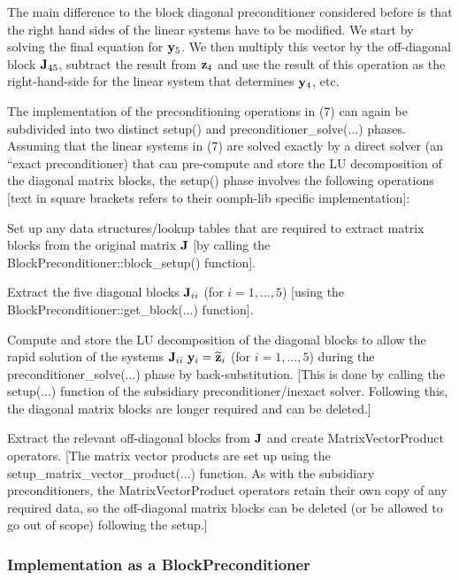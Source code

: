 The main difference to the block diagonal preconditioner considered before is that the right hand sides of the linear systems have to be modified. We start by solving the final equation for $ {\bf y}_5 $. We then multiply this vector by the off-\/diagonal block $ {\bf J}_{45} $, subtract the result from $ {\bf z}_4 $ and use the result of this operation as the right-\/hand-\/side for the linear system that determines $ {\bf y}_4$, etc.

The implementation of the preconditioning operations in (7) can again be subdivided into two distinct {\ttfamily setup()} and {\ttfamily preconditioner\+\_\+solve}(...) phases. Assuming that the linear systems in (7) are solved exactly by a direct solver (an ``exact preconditioner\textquotesingle{}\textquotesingle{}) that can pre-\/compute and store the LU decomposition of the diagonal matrix blocks, the {\ttfamily setup()} phase involves the following operations \mbox{[}text in square brackets refers to their {\ttfamily oomph-\/lib} specific implementation\mbox{]}\+:
\begin{DoxyItemize}
\item Set up any data structures/lookup tables that are required to extract matrix blocks from the original matrix ${\bf J}$ \mbox{[}by calling the {\ttfamily Block\+Preconditioner\+::block\+\_\+setup()} function\mbox{]}.
\item Extract the five diagonal blocks ${\bf J}_{ii}$ (for $i=1,...,5$) \mbox{[}using the {\ttfamily Block\+Preconditioner\+::get\+\_\+block}(...) function\mbox{]}.
\item Compute and store the LU decomposition of the diagonal blocks to allow the rapid solution of the systems ${\bf J}_{ii} \ {\bf y}_i = \widetilde{\bf z}_i$ (for $i=1,...,5$) during the {\ttfamily preconditioner\+\_\+solve}(...) phase by back-\/substitution. \mbox{[}This is done by calling the {\ttfamily setup}(...) function of the subsidiary preconditioner/inexact solver. Following this, the diagonal matrix blocks are longer required and can be deleted.\mbox{]}
\item Extract the relevant off-\/diagonal blocks from ${\bf J}$ and create {\ttfamily Matrix\+Vector\+Product} operators. \mbox{[}The matrix vector products are set up using the {\ttfamily setup\+\_\+matrix\+\_\+vector\+\_\+product}(...) function. As with the subsidiary preconditioners, the {\ttfamily Matrix\+Vector\+Product} operators retain their own copy of any required data, so the off-\/diagonal matrix blocks can be deleted (or be allowed to go out of scope) following the setup.\mbox{]}
\end{DoxyItemize}\hypertarget{index_upper_triangular_implementation}{}\subsubsection{Implementation as a Block\+Preconditioner}\label{index_upper_triangular_implementation}
